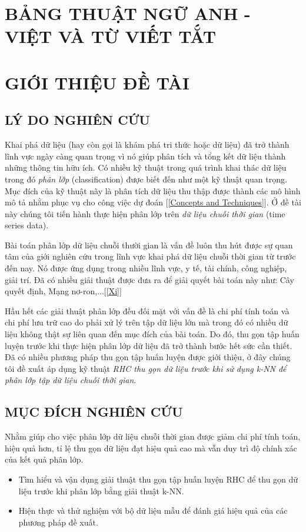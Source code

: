 \documentclass[13pt,oneside]{scrbook}
\newcommand\normalchapter{%
\titleformat{\chapter}[hang] 
{\normalfont\Large\bfseries}{\MakeUppercase{\chaptertitlename}\ \thechapter.}{1em}{\MakeUppercase} 
}
\begin{document}
\chapter*{BẢNG THUẬT NGỮ ANH - VIỆT VÀ TỪ VIẾT TẮT}
\newpage

\normalchapter
{}
\setcounter{page}{1}
\chapter{GIỚI THIỆU ĐỀ TÀI}\label{Sec:Phan1}
\section{LÝ DO NGHIÊN CỨU}
Khai phá dữ liệu (hay còn gọi là khám phá tri thức hoặc dữ liệu) đã trở thành
lĩnh vực ngày càng quan trọng vì nó giúp phân tích và tổng kết dữ liệu thành những thông tin hữu ích. 
Có nhiều kỹ thuật trong quá trình khai thác dữ liệu trong đó \textit{phân lớp} (classification) được biết đến như một kỹ thuật quan trọng. 
Mục đích của kỹ thuật này là phân tích dữ liệu thu thập được thành các mô hình mô tả nhằm phục vụ cho công việc dự đoán [\ref{Concepts and Techniques}]. 
Ở đề tài này chúng tôi tiến hành thực hiện phân lớp trên \textit{dữ liệu chuỗi thời gian} (time series data). 

Bài toán phân lớp dữ liệu chuỗi thười gian là vấn đề luôn thu hút được sự quan tâm của giới nghiên cứu trong lĩnh vực khai phá dữ liệu chuỗi thời gian từ trước đến nay. 
Nó được ứng dụng trong nhiều lĩnh vực, y tế, tài chính, công nghiệp, giải trí.
Đã có nhiều giải thuật được đưa ra để giải quyết bài toán này như: Cây quyết định, Mạng nơ-ron,...[\ref{Xi}]

Hầu hết các giải thuật phân lớp đều đối mặt với vấn đề là chi phí tính toán và chi phí lưu trữ cao do phải xử lý trên tập dữ liệu lớn mà trong đó có nhiều dữ liệu không thật sự liên quan đến mục đích của bài toán. 
Do đó, thu gọn tập huấn luyện trước khi thực hiện phân lớp dữ liệu đã trở thành bước hết sức cần thiết. 
Đã có nhiều phương pháp thu gọn tập huấn luyện được giới thiệu, ở đây chúng tôi đề xuất áp dụng kỹ thuật \textit{RHC thu gọn dữ liệu trước khi sử dụng k-NN để phân lớp tập dữ liệu chuỗi thời gian}.
	
\section{MỤC ĐÍCH NGHIÊN CỨU}
Nhằm giúp cho việc phân lớp dữ liệu chuỗi thời gian được giảm chi phí tính toán, hiệu quả hơn, tỉ lệ thu gọn dữ liệu đạt hiệu quả cao mà vẫn duy trì độ chính xác của kết quả phân lớp.
\begin{itemize}
\item Tìm hiểu và vận dụng giải thuật thu gọn tập huấn luyện RHC để thu gọn dữ liệu trước khi phân lớp bằng giải thuật k-NN.
\item Hiện thực và thử nghiệm với bộ dữ liệu mẫu để đánh giá hiệu quả của các phương pháp đề xuất.
\end{itemize}
\end{document}
